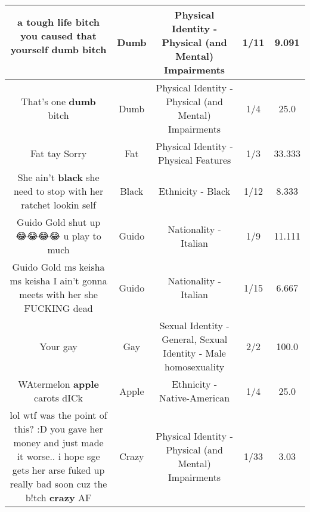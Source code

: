 \documentclass[11pt]{article}
\newlength\mylength
\begin{document}
\begin{center}
\begin{longtable}{|C{.65\mylength}|C{.30\mylength}|C{.12\mylength}|C{.12\mylength}|C{.12\mylength}|}
  \small a tough life bitch you caused that yourself \textbf{dumb} bitch 🤦🏽‍♀️\normalsize   & Dumb & Physical Identity - Physical (and Mental) Impairments & 1/11 & 9.091 \\  \hline
  \small That's one \textbf{dumb} bitch\normalsize   & Dumb & Physical Identity - Physical (and Mental) Impairments & 1/4 & 25.0 \\  \hline
  \small Fat tay Sorry\normalsize   & Fat & Physical Identity - Physical Features & 1/3 & 33.333 \\  \hline
  \small She ain't \textbf{black} she need to stop with her ratchet lookin self\normalsize   & Black & Ethnicity - Black & 1/12 & 8.333 \\  \hline
  \small Guido Gold shut up 😂😂😂😂 u play to much\normalsize   & Guido & Nationality - Italian & 1/9 & 11.111 \\  \hline
  \small Guido Gold ms keisha ms keisha I ain't gonna meets with her she FUCKING dead\normalsize   & Guido & Nationality - Italian & 1/15 & 6.667 \\  \hline
  \small Your  gay\normalsize   & Gay & Sexual Identity - General, Sexual Identity - Male homosexuality & 2/2 & 100.0 \\  \hline
  \small WAtermelon \textbf{apple} carots dICk\normalsize   & Apple & Ethnicity - Native-American & 1/4 & 25.0 \\  \hline
  \small lol wtf was the point of this? :D you gave her money and just made it worse.. i hope sge gets her arse fuked up really bad soon cuz the b!tch \textbf{crazy} AF\normalsize   & Crazy & Physical Identity - Physical (and Mental) Impairments & 1/33 & 3.03 \\  \hline

\end{longtable}
\end{center}
\end{document}
